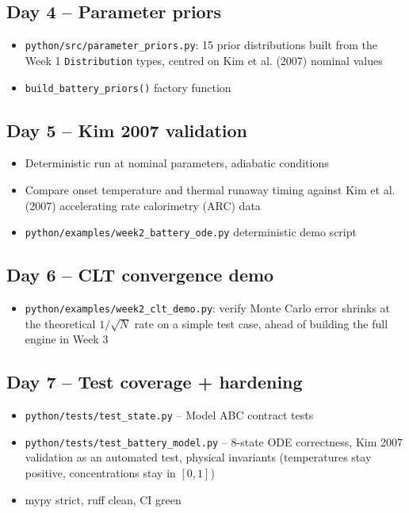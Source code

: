 \documentclass[11pt]{article}
\begin{document}
\subsection*{Day 4 -- Parameter priors}
\begin{itemize}[leftmargin=*]
  \item \texttt{python/src/parameter\_priors.py}: 15 prior distributions
    built from the Week 1 \texttt{Distribution} types, centred on Kim
    et al. (2007) nominal values
  \item \texttt{build\_battery\_priors()} factory function
\end{itemize}

\subsection*{Day 5 -- Kim 2007 validation}
\begin{itemize}[leftmargin=*]
  \item Deterministic run at nominal parameters, adiabatic conditions
  \item Compare onset temperature and thermal runaway timing against
    Kim et al. (2007) accelerating rate calorimetry (ARC) data
  \item \texttt{python/examples/week2\_battery\_ode.py} deterministic
    demo script
\end{itemize}

\subsection*{Day 6 -- CLT convergence demo}
\begin{itemize}[leftmargin=*]
  \item \texttt{python/examples/week2\_clt\_demo.py}: verify Monte
    Carlo error shrinks at the theoretical $1/\sqrt{N}$ rate on a
    simple test case, ahead of building the full engine in Week 3
\end{itemize}

\subsection*{Day 7 -- Test coverage + hardening}
\begin{itemize}[leftmargin=*]
  \item \texttt{python/tests/test\_state.py} -- Model ABC contract
    tests
  \item \texttt{python/tests/test\_battery\_model.py} -- 8-state ODE
    correctness, Kim 2007 validation as an automated test, physical
    invariants (temperatures stay positive, concentrations stay in
    $[0,1]$)
  \item mypy strict, ruff clean, CI green
\end{itemize}
\end{document}
